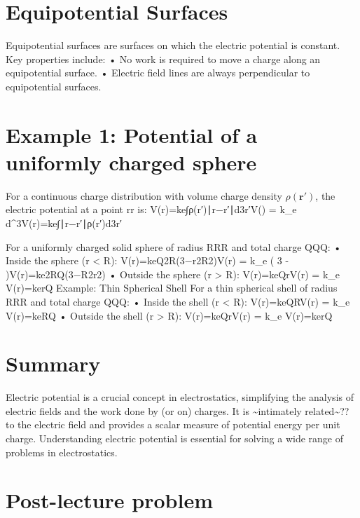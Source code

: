 \documentclass[
  letterpaper,
  DIV=11,
  numbers=noendperiod]{scrreprt}
\begin{document}
\section{Equipotential Surfaces}\label{equipotential-surfaces}

Equipotential surfaces are surfaces on which the electric potential is
constant. Key properties include: • No work is required to move a charge
along an equipotential surface. • Electric field lines are always
perpendicular to equipotential surfaces.

\section{Example 1: Potential of a uniformly charged
sphere}\label{example-1-potential-of-a-uniformly-charged-sphere}

For a continuous charge distribution with volume charge density
\(\rho(\mathrm{\mathbf{r}}')\), the electric potential at a point
rr is: V(r)=ke∫ρ(r′)∣r−r′∣d3r′V() = k\_e
\int {}
d\^{}3V(r)=ke∫∣r−r′∣ρ(r′)d3r′

For a uniformly charged solid sphere of radius RRR and total charge QQQ:
• Inside the sphere (r \textless{} R): V(r)=keQ2R(3−r2R2)V(r) = k\_e
 \left( 3 -  \right)V(r)=ke2RQ(3−R2r2) •
Outside the sphere (r \textgreater{} R): V(r)=keQrV(r) = k\_e
V(r)=kerQ Example: Thin Spherical Shell For a thin spherical
shell of radius RRR and total charge QQQ: • Inside the shell (r
\textless{} R): V(r)=keQRV(r) = k\_e V(r)=keRQ • Outside the
shell (r \textgreater{} R): V(r)=keQrV(r) = k\_e V(r)=kerQ

\section{Summary}\label{summary-1}

Electric potential is a crucial concept in electrostatics, simplifying
the analysis of electric fields and the work done by (or on) charges. It
is \textasciitilde intimately related\textasciitilde?? to the electric
field and provides a scalar measure of potential energy per unit charge.
Understanding electric potential is essential for solving a wide range
of problems in electrostatics.

\section{Post-lecture problem}\label{post-lecture-problem-1}
\end{document}
